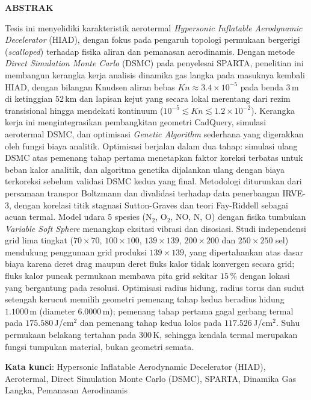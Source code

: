 \clearpage
{}
{}
\begin{center}
\textbf{\large  ABSTRAK}\\[0.5cm]
\end{center}

Tesis ini menyelidiki karakteristik aerotermal \emph{Hypersonic Inflatable Aerodynamic Decelerator} (HIAD), dengan fokus pada pengaruh topologi permukaan bergerigi (\emph{scalloped}) terhadap fisika aliran dan pemanasan aerodinamis. Dengan metode \emph{Direct Simulation Monte Carlo} (DSMC) pada penyelesai SPARTA, penelitian ini membangun kerangka kerja analisis dinamika gas langka pada masuknya kembali HIAD, dengan bilangan Knudsen aliran bebas $Kn \approx 3.4\times10^{-5}$ pada benda 3\,m di ketinggian 52\,km dan lapisan kejut yang secara lokal merentang dari rezim transisional hingga mendekati kontinuum ($10^{-5} \lesssim Kn \lesssim 1.2\times10^{-2}$). Kerangka kerja ini mengintegrasikan pembangkitan geometri CadQuery, simulasi aerotermal DSMC, dan optimisasi \emph{Genetic Algorithm} sederhana yang digerakkan oleh fungsi biaya analitik. Optimisasi berjalan dalam dua tahap: simulasi ulang DSMC atas pemenang tahap pertama menetapkan faktor koreksi terbatas untuk beban kalor analitik, dan algoritma genetika dijalankan ulang dengan biaya terkoreksi sebelum validasi DSMC kedua yang final. Metodologi diturunkan dari persamaan transpor Boltzmann dan divalidasi terhadap data penerbangan IRVE-3, dengan korelasi titik stagnasi Sutton-Graves dan teori Fay-Riddell sebagai acuan termal. Model udara 5 spesies (N$_2$, O$_2$, NO, N, O) dengan fisika tumbukan \emph{Variable Soft Sphere} menangkap eksitasi vibrasi dan disosiasi. Studi independensi grid lima tingkat ($70\times70$, $100\times100$, $139\times139$, $200\times200$ dan $250\times250$ sel) mendukung penggunaan grid produksi $139\times139$, yang dipertahankan atas dasar biaya karena deret drag maupun deret fluks kalor tidak konvergen secara grid; fluks kalor puncak permukaan membawa pita grid sekitar $15\,\%$ dengan lokasi yang bergantung pada resolusi. Optimisasi radius hidung, radius torus dan sudut setengah kerucut memilih geometri pemenang tahap kedua beradius hidung $1.1000$\,m (diameter $6.0000$\,m); pemenang tahap pertama gagal gerbang termal pada $175.580$\,J/cm$^2$ dan pemenang tahap kedua lolos pada $117.526$\,J/cm$^2$. Suhu permukaan belakang tertahan pada $300$\,K, sehingga kendala termal merupakan fungsi tumpukan material, bukan geometri semata.

\noindent \textbf{Kata kunci}: Hypersonic Inflatable Aerodynamic Decelerator (HIAD), Aerotermal, Direct Simulation Monte Carlo (DSMC), SPARTA, Dinamika Gas Langka, Pemanasan Aerodinamis  %
